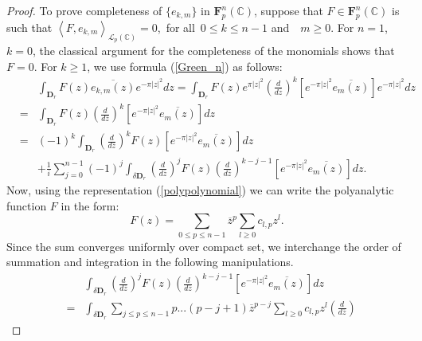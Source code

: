 \documentclass[12pt]{amsart}
\theoremstyle{plain}
\numberwithin{equation}{section}
\begin{document}
\begin{proof}
To prove completeness of $\{e_{k,m}\}$ in $\mathbf{F}_{p}^{n}(%
\mathbb{C}
)$, suppose that $F\in \mathbf{F}_{p}^{n}(%
\mathbb{C}
)$ is such that $\left\langle F,e_{k,m}\right\rangle _{\mathcal{L}_{p}(%
\mathbb{C}
)}=0$,\ for all\ $0\leq k\leq n-1$ and\ \ $m\geq 0.$ For $n=1$, $k=0$, the
classical argument for the completeness of the monomials shows that $F=0$.
For $k\geq 1$, we use formula (\ref{Green_n}) as follows: 
\begin{eqnarray*}
&&\int_{\mathbf{D}_{r}}F(z)\overline{e_{k,m}(z)}e^{-\pi \left\vert
z\right\vert ^{2}}dz=\int_{\mathbf{D}_{r}}F(z)e^{\pi \left\vert z\right\vert
^{2}}\left( \frac{d}{d\overline{z}}\right) ^{k}\left[ e^{-\pi \left\vert
z\right\vert ^{2}}\overline{e_{m}(z)}\right] e^{-\pi \left\vert z\right\vert
^{2}}dz \\
&=&\int_{\mathbf{D}_{r}}F(z)\left( \frac{d}{d\overline{z}}\right) ^{k}\left[
e^{-\pi \left\vert z\right\vert ^{2}}\overline{e_{m}(z)}\right] dz \\
&=&(-1)^{k}\int_{\mathbf{D}_{r}}\left( \frac{d}{d\overline{z}}\right)
^{k}F(z)\left[ e^{-\pi \left\vert z\right\vert ^{2}}\overline{e_{m}(z)}%
\right] dz \\
&&+\frac{1}{i}\sum_{j=0}^{n-1}(-1)^{j}\int_{\delta \mathbf{D}_{r}}\left( 
\frac{d}{d\overline{z}}\right) ^{j}F(z)\left( \frac{d}{d\overline{z}}\right)
^{k-j-1}\left[ e^{-\pi \left\vert z\right\vert ^{2}}\overline{e_{m}(z)}%
\right] dz\text{.}
\end{eqnarray*}%
Now, using the representation (\ref{polypolynomial}) we can write the
polyanalytic function $F$ in the form:%
\begin{equation*}
F(z)=\sum_{0\leq p\leq n-1}\overline{z}^{p}\sum_{l\geq 0}c_{l,p}z^{l}\text{.}
\end{equation*}%
Since the sum converges uniformly over compact set, we interchange the order
of summation and integration in the following manipulations. 
\begin{eqnarray*}
&&\int_{\delta \mathbf{D}_{r}}\left( \frac{d}{d\overline{z}}\right)
^{j}F(z)\left( \frac{d}{d\overline{z}}\right) ^{k-j-1}\left[ e^{-\pi
\left\vert z\right\vert ^{2}}\overline{e_{m}(z)}\right] dz \\
&=&\int_{\delta \mathbf{D}_{r}}\sum_{j\leq p\leq n-1}p...(p-j+1)\overline{z}%
^{p-j}\sum_{l\geq 0}c_{l,p}z^{l}\left( \frac{d}{d\overline{z}}\right)

\end{eqnarray*}
\end{proof}
\end{document}
